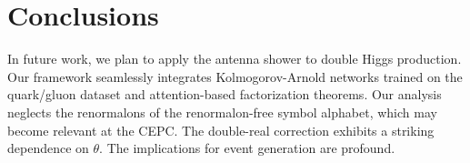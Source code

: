 \section{Conclusions}\label{sec:conclusions}

In future work, we plan to apply the antenna shower to double Higgs
production. Our framework seamlessly integrates Kolmogorov-Arnold
networks trained on the quark/gluon dataset and attention-based
factorization theorems. Our analysis neglects the renormalons of the
renormalon-free symbol alphabet, which may become relevant at the CEPC.
The double-real correction exhibits a striking dependence on $\theta$.
The implications for event generation are profound.

